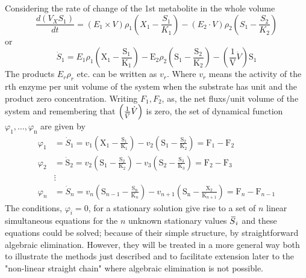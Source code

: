 Considering the rate of change of the 1st metabolite in the whole volume
%
$$
\frac{d\left(V_{X} S_{1}\right)}{dt} = \left(E_{1} \times V\right) \rho_{1}\left(X_{1} - \frac{S_{1}}{K_{1}}\right) - \left(E_{2} \cdot V\right) \rho_{2}\left(S_{1} - \frac{S_{2}}{K_{2}}\right)
$$
%
or
%
\begin{equation}
\dot{S}_{1} = E_{1} \rho_{1}\left(\mathrm{X}_{1}-\frac{\mathrm{S}_{1}}{\mathrm{K}_{1}}\right)-\mathrm{E}_{2} \rho_{2}\left(\mathrm{S}_{1}-\frac{\mathrm{S}_{2}}{\mathrm{K}_{2}}\right)-\left(\frac{1}{\mathrm{V}}\dot{V}\right) \mathrm{S}_{1}
\label{eqn:114}
\end{equation}
%
The products $E_{r} \rho_{r}$ etc. can be written as $v_{r}$. Where $v_{r}$ means the activity of the rth enzyme per unit volume of the system when the substrate has unit and the product zero concentration. Writing $F_{1}, F_{2}$, as, the net fluxs/unit volume of the system and remembering that $\left(\frac{1}{\,\overline{\!{V}}}\dot{V}\right)$ is zero, the set of dynamical function $\varphi_{1}, \ldots, \varphi_{\mathrm{n}}$ are given by
%
\begin{equation}
\begin{aligned}
 \varphi_{1} &=\dot{S}_{1}=v_{1}\left(\mathrm{X}_{1}-\frac{\mathrm{S}_{1}}{\mathrm{K}_{1}}\right)- v_{2}\left(\mathrm{S}_{1}-\frac{\mathrm{S}_{2}}{\mathrm{K}_{2}}\right)=\mathrm{F}_{1}-\mathrm{F}_{2} \\[4pt]
\varphi_{2}&=\dot{\mathrm{S}}_{2}=v_{2}\left(\mathrm{S}_{1}-\frac{\mathrm{S}_{2}}{\mathrm{K}_{2}}\right)-v_{3}\left(\mathrm{S}_{2}-\frac{\mathrm{S}_{3}}{\mathrm{K}_{3}}\right)=\mathrm{F}_{2}-\mathrm{F}_{3} \\
& \vdots
\\
 \varphi_{n}&=\dot{S}_{n}=v_{n}\left(\mathrm{S}_{n-1}-\frac{\mathrm{S}_{\mathrm{n}}}{\mathrm{K}_{n}}\right)-v_{n+1}\left(\mathrm{S}_{\mathrm{n}}-\frac{\mathrm{X}_{2}}{\mathrm{K}_{n+1}}\right)=\mathrm{F}_{n}-\mathrm{F}_{n-1}
\end{aligned} \tag{1.15a}
\end{equation}
%
The conditions, $\varphi_{i}=0$, for a stationary solution give rise to a set of $n$ linear simultaneous equations for the $n$ unknown stationary values $\,\overline{\!{S}}_{i}$ and these equations could be solved; because of their simple structure, by straightforward algebraic elimination. However, they will be treated in a more general way both to illustrate the methods just described and to facilitate extension later to the "non-linear straight chain" where algebraic elimination is not possible.

